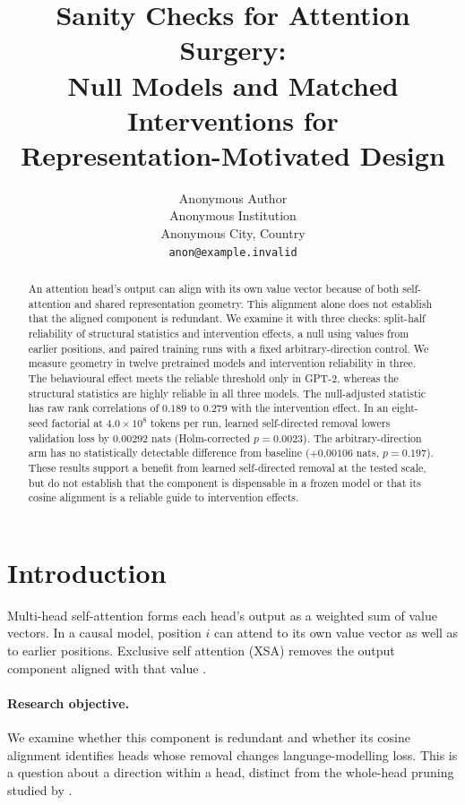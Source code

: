 \documentclass{article} %
\title{Sanity Checks for Attention Surgery: \\
Null Models and Matched Interventions for \\
Representation-Motivated Design}
\author{Anonymous Author \\
Anonymous Institution \\
Anonymous City, Country \\
\texttt{anon@example.invalid}
}
\begin{document}
\maketitle

\begin{abstract}
An attention head's output can align with its own value vector because of
both self-attention and shared representation geometry. This alignment alone
does not establish that the aligned component is redundant. We examine it
with three checks: split-half reliability of structural statistics and
intervention effects, a null using values from earlier positions, and paired
training runs with a fixed arbitrary-direction control. We measure geometry
in twelve pretrained models and intervention reliability in three. The
behavioural effect meets the reliable threshold only in GPT-2, whereas the
structural statistics are highly reliable in all three models. The
null-adjusted statistic has raw rank correlations of $0.189$ to $0.279$
with the intervention effect. In an eight-seed factorial at
$4.0\times10^{8}$ tokens per run, learned self-directed removal lowers
validation loss by $0.00292$ nats (Holm-corrected $p=0.0023$). The
arbitrary-direction arm has no statistically detectable difference from
baseline ($+0.00106$ nats, $p=0.197$). These results support a benefit from
learned self-directed removal at the tested scale, but do not establish that
the component is dispensable in a frozen model or that its cosine alignment
is a reliable guide to intervention effects.
\end{abstract}

\section{Introduction}

Multi-head self-attention \citep{vaswani2017attention} forms each head's
output as a weighted sum of value vectors. In a causal model, position $i$
can attend to its own value vector as well as to earlier positions. Exclusive
self attention (XSA) removes the output component aligned with that value
\citep{zhai2026xsa}.

\paragraph{Research objective.}
We examine whether this component is redundant and whether its cosine
alignment identifies heads whose removal changes language-modelling loss.
This is a question about a direction within a head, distinct from the
whole-head pruning studied by \citet{michel2019sixteen,voita2019analyzing}.
\end{document}
